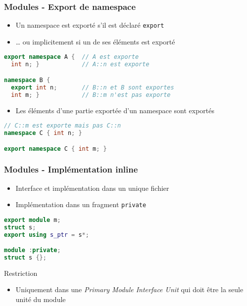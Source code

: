 \documentclass[C++.tex]{subfiles}
\begin{document}
\begin{frame}[fragile]
	\frametitle{Modules - Export de namespace}
	\begin{itemize}
		\item Un namespace est exporté s'il est déclaré \lstinline|export|
		\item \ldots{} ou implicitement si un de ses éléments est exporté
	\end{itemize}

	\begin{lstlisting}[language=C++]
export namespace A {  // A est exporte
  int n; }            // A::n est exporte

namespace B {
  export int n;       // B::n et B sont exportes
  int m; }            // B::m n'est pas exporte\end{lstlisting}

	\begin{itemize}
		\item Les éléments d'une partie exportée d'un namespace sont exportés
	\end{itemize}

	\begin{lstlisting}[language=C++]
// C::m est exporte mais pas C::n
namespace C { int n; }

export namespace C { int m; }\end{lstlisting}
\end{frame}

\begin{frame}[fragile]
	\frametitle{Modules - Implémentation inline}
	\begin{itemize}
		\item Interface et implémentation dans un unique fichier
		\item Implémentation dans un fragment \lstinline|private|
	\end{itemize}

	\begin{lstlisting}[language=C++]
export module m;
struct s;
export using s_ptr = s*;

module :private;
struct s {};\end{lstlisting}

	\begin{alertblock}{Restriction}
		\begin{itemize}
			\item Uniquement dans une \textit{Primary Module Interface Unit} qui doit être la seule unité du module
		\end{itemize}
	\end{alertblock}
\end{frame}
\end{document}
